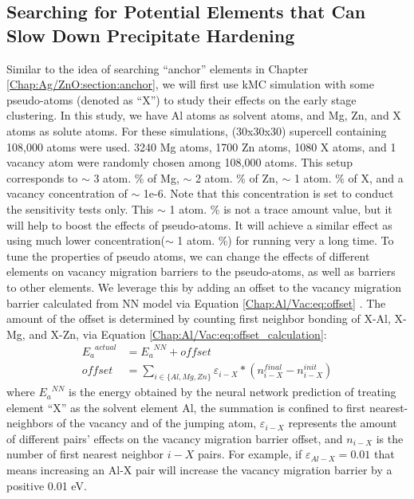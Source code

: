 \subsection{Searching for Potential Elements that Can Slow Down Precipitate Hardening}
\label{Chap:Al/Vac:pseudo}
Similar to the idea of searching ``anchor'' elements in Chapter \ref{Chap:Ag/ZnO:section:anchor}, we will first use \ac{kMC} simulation with some pseudo-atoms (denoted as ``X'') to study their effects on the early stage clustering. In this study, we have Al atoms as solvent atoms, and Mg, Zn, and X atoms as solute atoms. For these simulations, (30x30x30) supercell containing 108,000 atoms were used. 3240 Mg atoms, 1700 Zn atoms, 1080 X atoms, and 1 vacancy atom were randomly chosen among 108,000 atoms. This setup corresponds to $\sim$ 3 atom. \% of Mg, $\sim$ 2 atom. \% of Zn, $\sim$ 1 atom. \% of X, and a vacancy concentration of $\sim$ 1e-6. Note that this concentration is set to conduct the sensitivity tests only. This $\sim$ 1 atom. \% is not a trace amount value, but it will help to boost the effects of pseudo-atoms. It will achieve a similar effect as using much lower concentration($\sim$ 1 atom. \%) for running very a long time. To tune the properties of pseudo atoms, we can change the effects of different elements on vacancy migration barriers to the pseudo-atoms, as well as barriers to other elements. We leverage this by adding an offset to the vacancy migration barrier calculated from \ac{NN} model via Equation \ref{Chap:Al/Vac:eq:offset} . The amount of the offset is determined by counting first neighbor bonding of X-Al, X-Mg, and X-Zn, via Equation \ref{Chap:Al/Vac:eq:offset_calculation}:
\begin{subequations}
\begin{align}
{E_a}^{actual} & = {E_a}^{NN} + \textit{offset} \label{Chap:Al/Vac:eq:offset} \\
\textit{offset} & = \sum_{i\in\{Al, Mg, Zn\}} \varepsilon_{i-X} * ( n_{i-X}^{final} - n_{i-X}^{init}) \label{Chap:Al/Vac:eq:offset_calculation}
\end{align}
\end{subequations}
where ${E_a}^{NN}$ is the energy obtained by the neural network prediction of treating element ``X'' as the solvent element Al, the summation is confined to first nearest-neighbors of the vacancy and of the jumping atom, $\varepsilon_{i-X}$ represents the amount of different pairs' effects on the vacancy migration barrier offset, and $n_{i-X}$ is the number of first nearest neighbor $i-X$ pairs. For example, if $\varepsilon_{Al-X} = 0.01$ that means increasing an Al-X pair will increase the vacancy migration barrier by a positive 0.01 eV.


